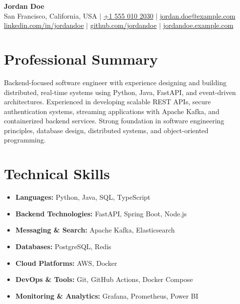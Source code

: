 \documentclass[10pt, letterpaper]{article}
\begin{document}
\begin{center}
  {\LARGE \textbf{Jordan Doe}} \\[4pt]
  San Francisco, California, USA \quad $\vert$ \quad
  \href{tel:+15550102030}{+1 555 010 2030} \quad $\vert$ \quad
  \href{mailto:jordan.doe@example.com}{jordan.doe@example.com} \\[3pt]
  \href{https://www.linkedin.com/in/jordandoe/}{linkedin.com/in/jordandoe} \quad $\vert$ \quad
  \href{https://github.com/jordandoe}{github.com/jordandoe} \quad $\vert$ \quad
  \href{https://jordandoe.example.com}{jordandoe.example.com}
\end{center}

\section{Professional Summary}

Backend-focused software engineer with experience designing and building distributed, real-time systems using Python, Java, FastAPI, and event-driven architectures. Experienced in developing scalable REST APIs, secure authentication systems, streaming applications with Apache Kafka, and containerized backend services. Strong foundation in software engineering principles, database design, distributed systems, and object-oriented programming.

\section{Technical Skills}

\begin{itemize}[leftmargin=0.18in, itemsep=5pt, topsep=4pt]
\item \textbf{Languages:} Python, Java, SQL, TypeScript
\item \textbf{Backend Technologies:} FastAPI, Spring Boot, Node.js
\item \textbf{Messaging \& Search:} Apache Kafka, Elasticsearch
\item \textbf{Databases:} PostgreSQL, Redis
\item \textbf{Cloud Platforms:} AWS, Docker
\item \textbf{DevOps \& Tools:} Git, GitHub Actions, Docker Compose
\item \textbf{Monitoring \& Analytics:} Grafana, Prometheus, Power BI
\end{itemize}
\end{document}
